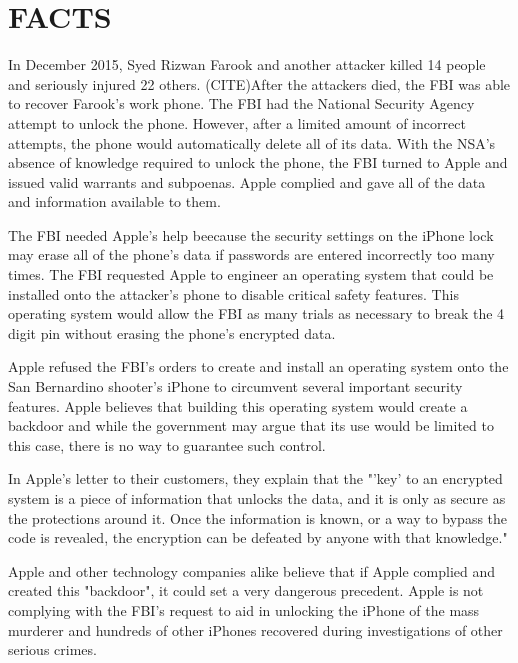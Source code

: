 
\section{FACTS}
In December 2015, Syed Rizwan Farook and another attacker killed 14 people and seriously injured 22 others. (CITE)After the attackers died, the FBI was able to recover Farook's work phone. The FBI had the National Security Agency attempt to unlock the phone. However, after a limited amount of incorrect attempts, the phone would automatically delete all of its data. With the NSA's absence of knowledge required to unlock the phone, the FBI turned to Apple and issued valid warrants and subpoenas. Apple complied and gave all of the data and information available to them.\cite{apple-letter}\par

The FBI needed Apple's help beecause the security settings on the iPhone lock may erase all of the phone's data if passwords are entered incorrectly too many times. The FBI requested Apple to engineer an operating system that could be installed onto the attacker's phone to disable critical safety features. This operating system would allow the FBI as many trials as necessary to break the 4 digit pin without erasing the phone's encrypted data. \cite{aljazeera}\par

Apple refused the FBI's orders to create and install an operating system onto the San Bernardino shooter's iPhone to circumvent several important security features. Apple believes that building this operating system would create a backdoor and while the government may argue that its use would be limited to this case, there is no way to guarantee such control. \cite{apple-letter}\par

In Apple's letter to their customers, they explain that the "'key' to an encrypted system is a piece of information that unlocks the data, and it is only as secure as the protections around it. Once the information is known, or a way to bypass the code is revealed, the encryption can be defeated by anyone with that knowledge." \cite{apple-letter}\par
 
Apple and other technology companies alike believe that if Apple complied and created this "backdoor", it could set a very dangerous precedent. 
Apple is not complying with the FBI's request to aid in unlocking the iPhone of the mass murderer and hundreds of other iPhones recovered during investigations of other serious crimes.
\vspace{0.4cm}





